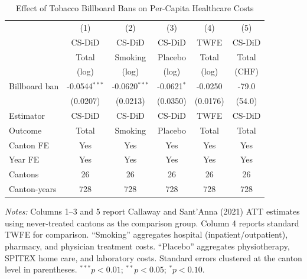\begin{table}[t]
\centering
\caption{Effect of Tobacco Billboard Bans on Per-Capita Healthcare Costs}
\label{tab:main}
\begin{tabular}{lccccc}
\hline\hline
 & (1) & (2) & (3) & (4) & (5) \\
 & CS-DiD & CS-DiD & CS-DiD & TWFE & CS-DiD \\
 & Total & Smoking & Placebo & Total & Total \\
 & (log) & (log) & (log) & (log) & (CHF) \\
\hline
Billboard ban & -0.0544$^{***}$ & -0.0620$^{***}$ & -0.0621$^{*}$ & -0.0250 & -79.0 \\
 & (0.0207) & (0.0213) & (0.0350) & (0.0176) & (54.0) \\
\addlinespace
Estimator & CS-DiD & CS-DiD & CS-DiD & TWFE & CS-DiD \\
Outcome & Total & Smoking & Placebo & Total & Total \\
Canton FE & Yes & Yes & Yes & Yes & Yes \\
Year FE & Yes & Yes & Yes & Yes & Yes \\
Cantons & 26 & 26 & 26 & 26 & 26 \\
Canton-years & 728 & 728 & 728 & 728 & 728 \\
\hline\hline
\end{tabular}
\begin{tablenotes}
\item \textit{Notes:} Columns 1--3 and 5 report Callaway and Sant'Anna (2021) ATT estimates using never-treated cantons as the comparison group. Column 4 reports standard TWFE for comparison. ``Smoking'' aggregates hospital (inpatient/outpatient), pharmacy, and physician treatment costs. ``Placebo'' aggregates physiotherapy, SPITEX home care, and laboratory costs. Standard errors clustered at the canton level in parentheses. $^{***}p<0.01$; $^{**}p<0.05$; $^{*}p<0.10$.
\end{tablenotes}
\end{table}

